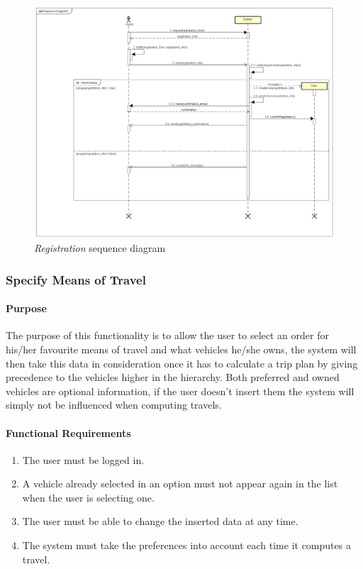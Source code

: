 \begin{figure}
	\includegraphics[width=\textheight, height=\textwidth, angle=90, keepaspectratio=true]{Img/RegistrationSQ}
	\caption{\emph{Registration} sequence diagram}
	\label{fig:registrationsq}
\end{figure}

\clearpage
\subsubsection{Specify Means of Travel}
\paragraph*{Purpose\\}
The purpose of this functionality is to allow the user to select an order for his/her favourite means of travel and what vehicles he/she owns, the system will then take this data in consideration once it has to calculate a trip plan by giving precedence to the vehicles higher in the hierarchy.
Both preferred and owned vehicles are optional information, if the user doesn't insert them the system will simply not be influenced when computing travels.

\paragraph*{Functional Requirements}
\begin{enumerate}[label=R.\arabic*:,resume]
	\item The user must be logged in.
	\item A vehicle already selected in an option must not appear again in the list when the user is selecting one.
	\item The user must be able to change the inserted data at any time.
	\item The system must take the preferences into account each time it computes a travel.
\end{enumerate}

